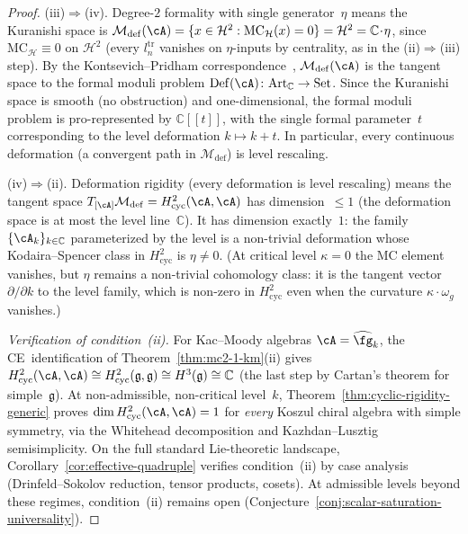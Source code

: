 \begin{proof}
\smallskip\noindent
\textup{(iii)}$\Rightarrow$\textup{(iv)}.
Degree-$2$ formality with single generator~$\eta$ means the
Kuranishi space is
$\mathcal{M}_{\mathrm{def}}(\cA) =
\{x \in \mathcal{H}^2 :
\mathrm{MC}_{\mathcal{H}}(x) = 0\}
= \mathcal{H}^2 = \mathbb{C}\!\cdot\!\eta$,
since $\mathrm{MC}_{\mathcal{H}} \equiv 0$ on
$\mathcal{H}^2$ (every $l_n^{\mathrm{tr}}$
vanishes on $\eta$-inputs by centrality,
as in the (ii)$\Rightarrow$(iii) step).
By the Kontsevich--Pridham correspondence~\cite{Pridham17},
$\mathcal{M}_{\mathrm{def}}(\cA)$ is the tangent space to
the formal moduli problem
$\mathrm{Def}(\cA) \colon \mathrm{Art}_{\mathbb{C}} \to
\mathrm{Set}$.
Since the Kuranishi space is smooth (no obstruction) and
one-dimensional, the formal moduli problem is pro-represented by
$\mathbb{C}[[t]]$, with the single formal parameter~$t$
corresponding to the level deformation
$k \mapsto k + t$.  In particular, every continuous deformation
(a convergent path in $\mathcal{M}_{\mathrm{def}}$) is
level rescaling.

\smallskip\noindent
\textup{(iv)}$\Rightarrow$\textup{(ii)}.
Deformation rigidity (every deformation is level rescaling)
means the tangent space
$T_{[\cA]}\mathcal{M}_{\mathrm{def}}
= H^2_{\mathrm{cyc}}(\cA,\cA)$
has dimension~$\leq 1$
(the deformation space is at most the level line~$\mathbb{C}$).
It has dimension exactly~$1$: the family
$\{\cA_k\}_{k \in \mathbb{C}}$ parameterized by the level
is a non-trivial deformation whose Kodaira--Spencer class
in $H^2_{\mathrm{cyc}}$ is $\eta \neq 0$.
(At critical level $\kappa = 0$ the MC element vanishes, but
$\eta$ remains a non-trivial cohomology class:
it is the tangent vector $\partial/\partial k$ to the level
family, which is non-zero in $H^2_{\mathrm{cyc}}$ even when
the curvature $\kappa \cdot \omega_g$ vanishes.)

\smallskip\noindent
\emph{Verification of condition~\textup{(ii)}.}
For Kac--Moody algebras $\cA = \widehat{\fg}_k$,
the CE~identification of
Theorem~\ref{thm:mc2-1-km}(ii) gives
$H^2_{\mathrm{cyc}}(\cA,\cA) \cong
H^2_{\mathrm{cyc}}(\mathfrak{g},\mathfrak{g})
\cong H^3(\mathfrak{g}) \cong \mathbb{C}$
(the last step by Cartan's theorem for
simple~$\mathfrak{g}$).
At non-admissible, non-critical level~$k$,
Theorem~\ref{thm:cyclic-rigidity-generic}
proves $\dim H^2_{\mathrm{cyc}}(\cA,\cA) = 1$
for \emph{every} Koszul chiral algebra with
simple symmetry, via the Whitehead decomposition
and Kazhdan--Lusztig semisimplicity.
On the full standard Lie-theoretic landscape,
Corollary~\ref{cor:effective-quadruple} verifies
condition~(ii) by case analysis
(Drinfeld--Sokolov reduction, tensor products, cosets).
At admissible levels beyond these regimes,
condition~(ii) remains open
(Conjecture~\ref{conj:scalar-saturation-universality}).
\end{proof}

